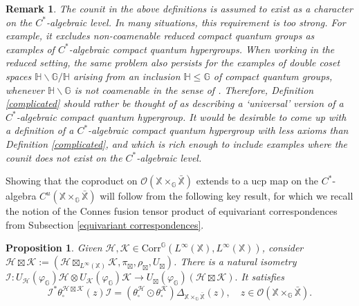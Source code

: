 \documentclass[reqno]{amsart}
\numberwithin{equation}{section}
\newtheorem{Prop}[Theorem]{Proposition}
\newtheorem{Rem}[Theorem]{Remark}
\newcommand\XGX{\X\times_\G \bar{\X}}
\renewcommand{\H}{\mathbb{H}}
\newcommand{\mcH}{\mathcal{H}}
\newcommand{\mcK}{\mathcal{K}}
\newcommand{\mcO}{\mathcal{O}}
\newcommand{\G}{\mathbb{G}}
\newcommand{\X}{\mathbb{X}}
\newcommand{\Corr}{\mathrm{Corr}}
\begin{document}
\begin{Rem}\label{completions}
The counit in the above definitions is assumed to exist as a character on the $C^*$-algebraic level. In many situations, this requirement is too strong. For example, it excludes non-coamenable reduced compact quantum groups as examples of $C^*$-algebraic compact quantum hypergroups. When working in the reduced setting, the same problem also persists for the examples of double coset spaces $\H\backslash \G/\H$ arising from an inclusion $\H\le \G$ of compact quantum groups, whenever $\H\backslash \G$ is not coamenable in the sense of \cite{AK24}. Therefore, Definition \ref{complicated} should rather be thought of as describing a `universal' version of a $C^*$-algebraic compact quantum hypergroup. It would be desirable to come up with a definition of a $C^*$-algebraic compact quantum hypergroup with less axioms than Definition \ref{complicated}, and which is rich enough to include examples where the counit does not exist on the $C^*$-algebraic level. 
\end{Rem}


Showing that the coproduct on $\mcO(\XGX)$ extends to a ucp map on the $C^*$-algebra $C^u(\XGX)$ will follow from the following key result, for which we recall the notion of the Connes fusion tensor product of equivariant correspondences from Subsection \ref{equivariant correspondences}.

 \begin{Prop}\label{keyresult}
  Given $\mcH, \mcK\in \Corr^\G(L^\infty(\X), L^\infty(\X))$, consider $\mcH\boxtimes\mcK:= (\mcH\boxtimes_{L^\infty(\X)}\mcK, \pi_\boxtimes, \rho_\boxtimes, U_\boxtimes)$. There is a natural isometry
  $\mathcal{I}: U_\mcH(\varphi_\G)\mcH\otimes U_\mcK(\varphi_\G)\mcK\to U_{\boxtimes}(\varphi_\G)(\mcH\boxtimes\mcK).$
  It satisfies
  \begin{equation}\label{intertwining}
      \mathcal{I}^* \theta_\square^{\mcH\boxtimes \mcK}(z) \mathcal{I} = (\theta_\square^\mcH\odot \theta_\square^\mcK)\Delta_{\XGX}(z), \quad z\in \mcO(\XGX).
  \end{equation}
 \end{Prop}
\end{document}
